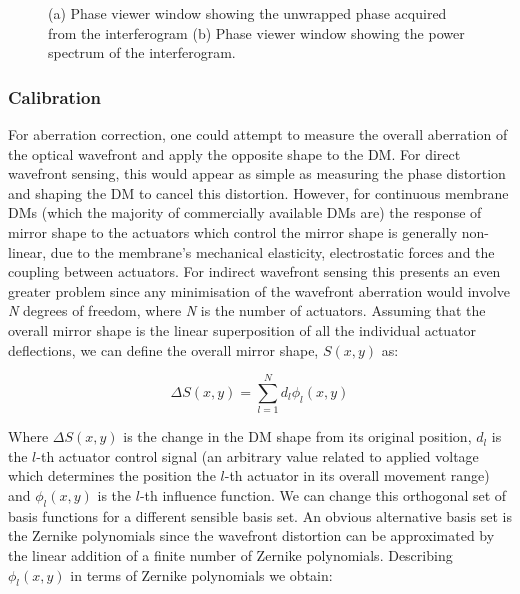 \begin{figure}[h]
\begin{subfigure}{0.45\textwidth}
		\caption{}
		\label{fig:phase_viewer_ft}
	\end{subfigure}
	\caption{(a) Phase viewer window showing the unwrapped phase acquired from the interferogram (b) Phase viewer window showing the power spectrum of the interferogram. }
	\label{fig:phase_viewer}
\end{figure}

\subsubsection{Calibration}
\label{subsubsec:calibration}

For aberration correction, one could attempt to measure the overall aberration of the optical wavefront and apply the opposite shape to the DM. For direct wavefront sensing, this would appear as simple as measuring the phase distortion and shaping the DM to cancel this distortion. However, for continuous membrane DMs (which the majority of commercially available DMs are) the response of mirror shape to the actuators which control the mirror shape is generally non-linear, due to the membrane's mechanical elasticity, electrostatic forces and the coupling between actuators.\cite{Zhu:99} For indirect wavefront sensing this presents an even greater problem since any minimisation of the wavefront aberration would involve \textit{N} degrees of freedom, where \textit{N} is the number of actuators. Assuming that the overall mirror shape is the linear superposition of all the individual actuator deflections, we can define the overall mirror shape, $S(x,y)$ as:

\begin{equation}\label{eq:surface_shape}
\Delta S(x,y) = \sum_{l=1}^{N} d_{l}\phi_{l}(x,y)
\end{equation}

Where $\Delta S(x,y)$ is the change in the DM shape from its original position, $d_l$ is the $l$-th actuator control signal (an arbitrary value related to applied voltage which determines the position the $l$-th actuator in its overall movement range)	and $\phi_{l}(x,y)$ is the $l$-th influence function. We can change this orthogonal set of basis functions for a different sensible basis set. An obvious alternative basis set is the Zernike polynomials since the wavefront distortion can be approximated by the linear addition of a finite number of Zernike polynomials.\cite{von1934beugungstheorie,noll1976zernike} Describing $\phi_{l}(x,y)$ in terms of Zernike polynomials we obtain:

